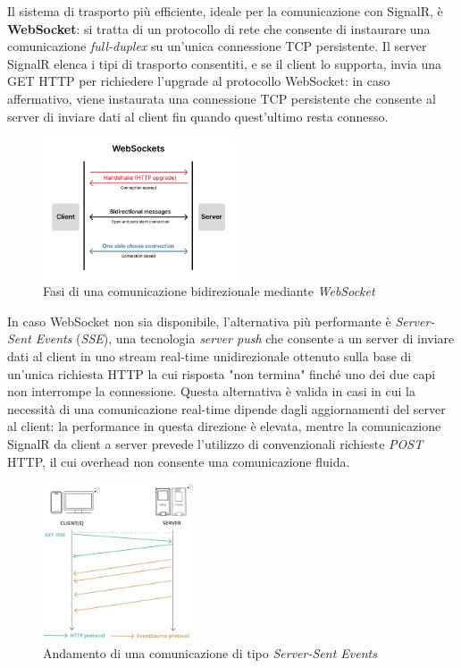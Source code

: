 Il sistema di trasporto più efficiente, ideale per la comunicazione con SignalR, è \textbf{WebSocket}: si tratta di un protocollo di rete che consente di instaurare una comunicazione \emph{full-duplex} su un'unica connessione TCP persistente. Il server SignalR elenca i tipi di trasporto consentiti, e se il client lo supporta, invia una GET HTTP per richiedere l'upgrade al protocollo WebSocket: in caso affermativo, viene instaurata una connessione TCP persistente che consente al server di inviare dati al client fin quando quest'ultimo resta connesso.
\begin{figure}[H]
    \centering
    \includegraphics[width=0.5\textwidth]{fig/websocket.png}
    \caption[Diagramma Web Socket]{Fasi di una comunicazione bidirezionale mediante \emph{WebSocket}}
\end{figure}

In caso WebSocket non sia disponibile, l'alternativa più performante è \emph{Server-Sent Events} (\emph{SSE}), una tecnologia \emph{server push} che consente a un server di inviare dati al client in uno stream real-time unidirezionale ottenuto sulla base di un'unica richiesta HTTP la cui risposta "non termina" finché uno dei due capi non interrompe la connessione.
Questa alternativa è valida in casi in cui la necessità di una comunicazione real-time dipende dagli aggiornamenti del server al client: la performance in questa direzione è elevata, mentre la comunicazione SignalR da client a server prevede l'utilizzo di convenzionali richieste \emph{POST} HTTP, il cui overhead non consente una comunicazione fluida.
\begin{figure}[H]
    \centering
    \includegraphics[width=0.4\textwidth]{fig/sse.png}
    \caption[Diagramma SSE]{Andamento di una comunicazione di tipo \emph{Server-Sent Events}}
\end{figure}

